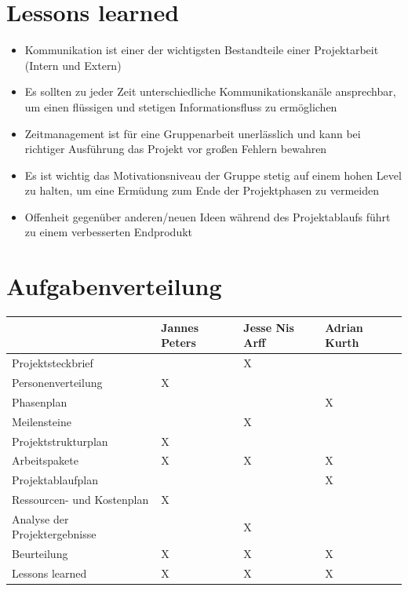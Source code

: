 \documentclass{scrartcl}
\begin{document}
\section{Lessons learned}
\begin{itemize}
	\item {Kommunikation ist einer der wichtigsten Bestandteile einer Projektarbeit (Intern und Extern) }
	\item {Es sollten zu jeder Zeit unterschiedliche Kommunikationskanäle ansprechbar, um einen flüssigen und stetigen Informationsfluss zu ermöglichen}
	\item {Zeitmanagement ist für eine Gruppenarbeit unerlässlich und kann bei richtiger Ausführung das Projekt vor großen Fehlern bewahren}
	\item {Es ist wichtig das Motivationsniveau der Gruppe stetig auf einem hohen Level zu halten, um eine Ermüdung zum Ende der Projektphasen zu vermeiden}
	\item {Offenheit gegenüber anderen/neuen Ideen während des Projektablaufs führt zu einem verbesserten Endprodukt}
\end{itemize}

\section{Aufgabenverteilung}

\begin{table}[H]
	\centering
	\label{my-label}
	\begin{tabular}{|l|l|l|l|}
		\hline
		& Jannes Peters & Jesse Nis Arff & Adrian Kurth \\ \hline
		Projektsteckbrief &  &X  &  \\ \hline
		Personenverteilung &X  &  &  \\ \hline
		Phasenplan &  &  &X  \\ \hline
		Meilensteine &  &X  &  \\ \hline
		Projektstrukturplan &X  &  &  \\ \hline
		Arbeitspakete &X  &X  &X  \\ \hline
		Projektablaufplan &  &  &X  \\ \hline
		Ressourcen- und Kostenplan &X  &  &  \\ \hline
		Analyse der Projektergebnisse &  &X  &  \\ \hline
		Beurteilung &X  &X  &X  \\ \hline
		Lessons learned &X  &X  &X  \\ \hline
	\end{tabular}
\end{table}
\end{document}
